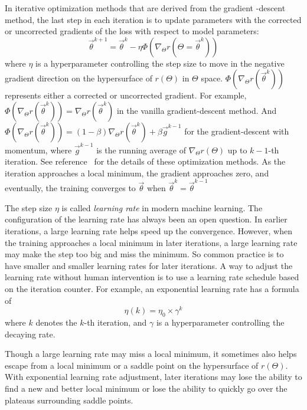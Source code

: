 In iterative optimization methods that are derived from the gradient -descent method, the last step in each iteration is to update parameters with the corrected or uncorrected gradients of the loss with respect to model parameters:
\begin{equation}
    \vec{\theta}^{k+1} = \vec{\theta}^{k} - \eta\Phi(\nabla_{\Theta}r(\Theta=\vec{\theta}^k))
\end{equation}
where $\eta$ is a hyperparameter controlling the step size to move in the negative gradient direction on the hypersurface of $r(\Theta)$ in $\Theta$ space.
$\Phi(\nabla_{\Theta}r(\vec{\theta}^k))$ represents either a corrected or uncorrected gradient.
For example, $\Phi(\nabla_{\Theta}r(\vec{\theta}^k))=\nabla_{\Theta}r(\vec{\theta}^k)$ in the vanilla gradient-descent method.
And $\Phi(\nabla_{\Theta}r(\vec{\theta}^k)) = \left(1-\beta\right)\nabla_{\Theta}r(\vec{\theta}^k) + \beta \vec{g}^{k-1}$ for the gradient-descent with momentum, where $\vec{g}^{k-1}$ is the running average of $\nabla_{\Theta}r(\Theta)$ up to $k-1$-th iteration.
See reference~\cite[Section~8.3]{goodfellow_deep_2016} for the details of these optimization methods.
As the iteration approaches a local minimum, the gradient approaches zero, and eventually, the training converges to $\vec{\theta}$ when $\vec{\theta}^k=\vec{\theta}^{k-1}$

The step size $\eta$ is called {\it learning rate} in modern machine learning.
The configuration of the learning rate has always been an open question.
In earlier iterations, a large learning rate helps speed up the convergence.
However, when the training approaches a local minimum in later iterations, a large learning rate may make the step too big and miss the minimum.
So common practice is to have smaller and smaller learning rates for later iterations.
A way to adjust the learning rate without human intervention is to use a learning rate schedule based on the iteration counter.
For example, an exponential learning rate has a formula of
\begin{equation}
    \eta(k) = \eta_0 \times \gamma^k
\end{equation}
where $k$ denotes the $k$-th iteration, and $\gamma$ is a hyperparameter controlling the decaying rate.

Though a large learning rate may miss a local minimum, it sometimes also helps escape from a local minimum or a saddle point on the hypersurface of $r(\Theta)$.
With exponential learning rate adjustment, later iterations may lose the ability to find a new and better local minimum or lose the ability to quickly go over the plateaus surrounding saddle points.


